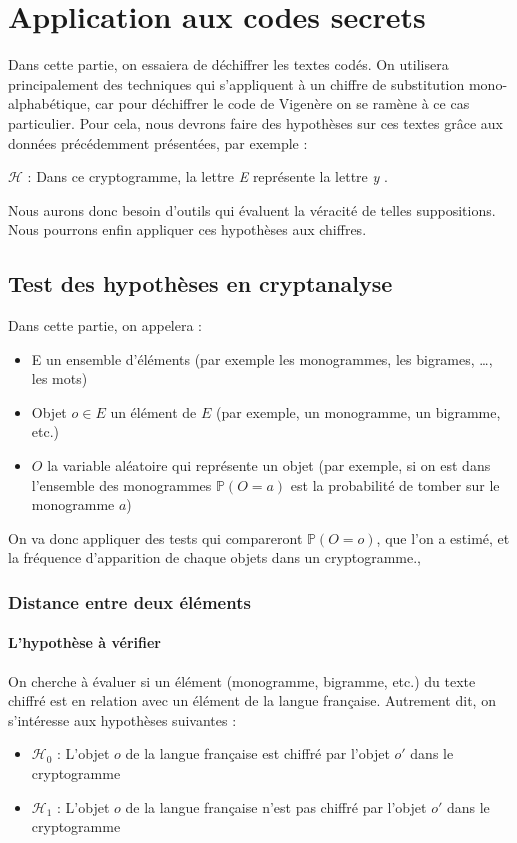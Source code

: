 \documentclass[a4paper, titlepage]{livret}
\begin{document}
\chapter{Application aux codes secrets}
Dans cette partie, on essaiera de déchiffrer les textes codés.
On utilisera principalement des techniques qui s'appliquent à un chiffre de substitution mono-alphabétique, car pour déchiffrer le code de Vigenère on se ramène à ce cas particulier.
Pour cela, nous devrons faire des hypothèses sur ces textes grâce aux données précédemment présentées, par exemple :
\begin{center}
 $\mathcal{H} $ : \og Dans ce cryptogramme, la lettre \emph{E} représente la lettre \emph{y} \fg{}.
\end{center}
Nous aurons donc besoin d'outils qui évaluent la véracité de telles suppositions.
Nous pourrons enfin appliquer ces hypothèses aux chiffres.

\section{Test des hypothèses en cryptanalyse}

Dans cette partie, on appelera :
\begin{itemize}
	\item E un ensemble d'éléments (par exemple les monogrammes, les bigrames, …, les mots)
	\item Objet $o \in E$ un élément de $E$ (par exemple, un monogramme, un bigramme, etc.)
	\item $O$ la variable aléatoire qui représente un objet (par exemple, si on est dans l'ensemble des monogrammes $\mathbb{P}(O = a)$ est la probabilité de tomber sur le monogramme $a$)
\end{itemize}

On va donc appliquer des tests qui compareront $\mathbb{P}(O = o)$, que l'on a estimé, et la fréquence d'apparition de chaque objets dans un cryptogramme.,

\subsection{Distance entre deux éléments}
\subsubsection{L'hypothèse à vérifier}
On cherche à évaluer si un élément (monogramme, bigramme, etc.) du texte chiffré est en relation avec un élément de la langue française.
Autrement dit, on s'intéresse aux hypothèses suivantes :
\begin{itemize}
 \item $\mathcal{H}_{0}$ : \og L'objet $o$ de la langue française est chiffré par l'objet $o'$ dans le cryptogramme \fg{}
 \item $\mathcal{H}_{1}$  : \og L'objet $o$ de la langue française n'est pas chiffré par l'objet $o'$ dans le cryptogramme \fg{}
\end{itemize}
\end{document}
